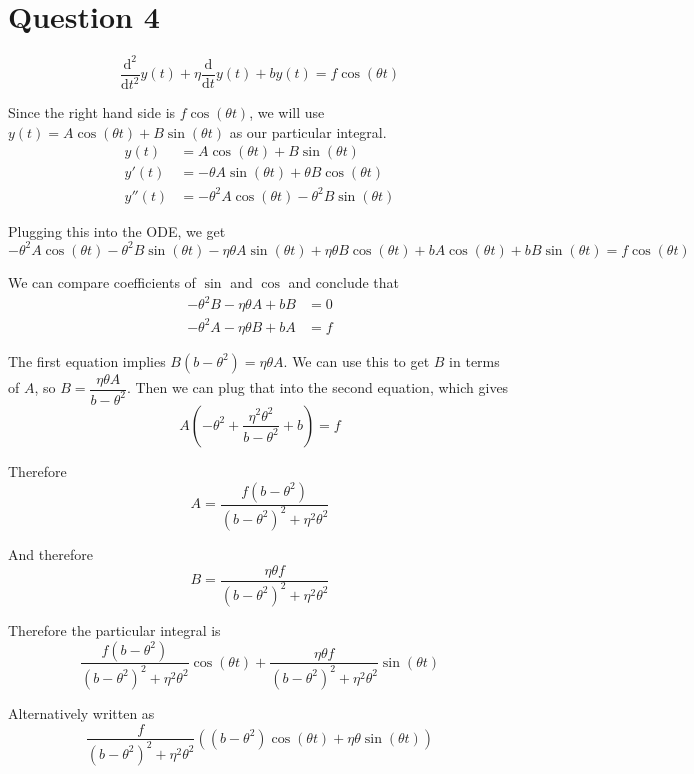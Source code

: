 \documentclass[a4paper]{article}
\begin{document}

\section*{Question 4}

$$\frac{\mathrm d^2}{\mathrm d t^2} y(t) + \eta \frac{\mathrm d}{\mathrm d t} y(t) + b y(t) = f \cos(\theta t)$$

Since the right hand side is $f \cos(\theta t)$, we will use $y(t) = A \cos(\theta t) + B \sin(\theta t)$ as our particular integral.
\begin{align*}
	y(t)   &= A \cos(\theta t) + B \sin(\theta t)\\
	y'(t)  &= -\theta A \sin(\theta t) + \theta B \cos(\theta t)\\
	y''(t) &= -\theta^2 A \cos(\theta t) - \theta^2 B \sin(\theta t)
\end{align*}

Plugging this into the ODE, we get $$-\theta^2 A \cos(\theta t) - \theta^2 B \sin(\theta t) -\eta\theta A \sin(\theta t) + \eta\theta B \cos(\theta t) + bA \cos(\theta t) + bB \sin(\theta t) = f \cos(\theta t)$$

We can compare coefficients of $\sin$ and $\cos$ and conclude that \begin{align*}
	-\theta^2 B - \eta\theta A + bB &= 0\\
	-\theta^2 A - \eta\theta B + bA &= f
\end{align*}

The first equation implies $B(b - \theta^2) = \eta\theta A$. We can use this to get $B$ in terms of $A$, so $B = \dfrac{\eta\theta A}{b - \theta^2}$. Then we can plug that into the second equation, which gives $$A \left(-\theta^2 + \frac{\eta^2 \theta^2}{b - \theta^2} + b\right) = f$$

Therefore $$A = \frac{f (b - \theta^2)}{(b - \theta^2)^2 + \eta^2 \theta^2}$$

And therefore $$B = \frac{\eta \theta f}{(b - \theta^2)^2 + \eta^2 \theta^2}$$

Therefore the particular integral is $$\frac{f (b - \theta^2)}{(b - \theta^2)^2 + \eta^2 \theta^2} \cos(\theta t) + \frac{\eta \theta f}{(b - \theta^2)^2 + \eta^2 \theta^2} \sin (\theta t)$$

Alternatively written as $$\frac{f}{(b - \theta^2)^2 + \eta^2 \theta^2} \left( (b - \theta^2) \cos(\theta t) + \eta \theta \sin(\theta t) \right)$$
\end{document}
